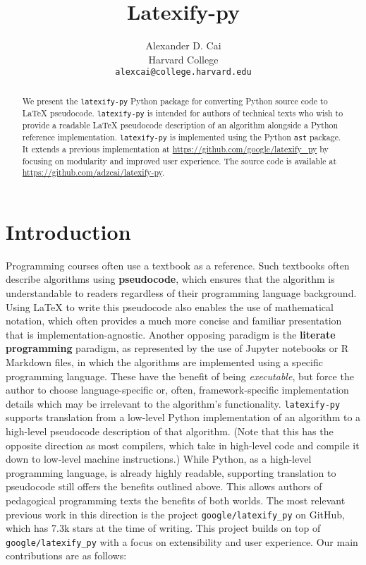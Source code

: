 \documentclass{article}
\title{Latexify-py}
\author{%
  Alexander D. Cai \\
  Harvard College \\
  \texttt{alexcai@college.harvard.edu}
}
\newcommand{\ourpkg}{\texttt{latexify-py}}
\newcommand{\theirpkg}{\texttt{google/latexify\_py}}
\newcommand{\vocab}[1]{\textbf{#1}}
\begin{document}
\maketitle


\begin{abstract}
  We present the \ourpkg{} Python package for converting Python source code to \LaTeX{} pseudocode.
  \ourpkg{} is intended for authors of technical texts who wish to provide a readable \LaTeX{} pseudocode description of an algorithm alongside a Python reference implementation.
  \ourpkg{} is implemented using the Python \texttt{ast} package.
  It extends a previous implementation at \url{https://github.com/google/latexify_py} by focusing on modularity and improved user experience.
  The source code is available at \url{https://github.com/adzcai/latexify-py}.
\end{abstract}


\section{Introduction}

Programming courses often use a textbook as a reference.
Such textbooks often describe algorithms using \vocab{pseudocode},
which ensures that the algorithm is understandable to readers regardless of their programming language background.
Using \LaTeX{} to write this pseudocode also enables the use of mathematical notation,
which often provides a much more concise and familiar presentation that is implementation-agnostic.
Another opposing paradigm is the \vocab{literate programming} paradigm,
as represented by the use of Jupyter notebooks or R Markdown files,
in which the algorithms are implemented using a specific programming language.
These have the benefit of being \emph{executable},
but force the author to choose language-specific or, often, framework-specific implementation details which may be irrelevant to the algorithm's functionality.
\ourpkg{} supports translation from a low-level Python implementation of an algorithm to a high-level pseudocode description of that algorithm.
(Note that this has the opposite direction as most compilers, which take in high-level code and compile it down to low-level machine instructions.)
While Python, as a high-level programming language,
is already highly readable,
supporting translation to pseudocode still offers the benefits outlined above.
This allows authors of pedagogical programming texts the benefits of both worlds.
The most relevant previous work in this direction is the project \theirpkg{} on GitHub,
which has 7.3k stars at the time of writing.
This project builds on top of \theirpkg{} with a focus on extensibility and user experience.
Our main contributions are as follows:
\end{document}
